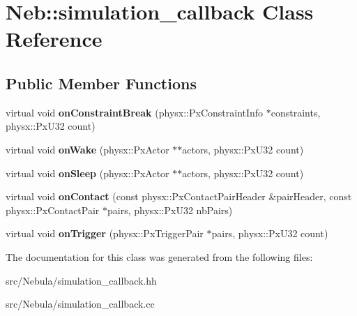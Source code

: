 \hypertarget{classNeb_1_1simulation__callback}{\section{\-Neb\-:\-:simulation\-\_\-callback \-Class \-Reference}
\label{classNeb_1_1simulation__callback}
}
\subsection*{\-Public \-Member \-Functions}
\begin{DoxyCompactItemize}
\item 
\hypertarget{classNeb_1_1simulation__callback_ac4620ed6b4fd70dd432be23811464f05}{virtual void {\bfseries on\-Constraint\-Break} (physx\-::\-Px\-Constraint\-Info $\ast$constraints, physx\-::\-Px\-U32 count)}\label{classNeb_1_1simulation__callback_ac4620ed6b4fd70dd432be23811464f05}

\item 
\hypertarget{classNeb_1_1simulation__callback_a0dcb1c9b1501e762bb31e0f86b269955}{virtual void {\bfseries on\-Wake} (physx\-::\-Px\-Actor $\ast$$\ast$actors, physx\-::\-Px\-U32 count)}\label{classNeb_1_1simulation__callback_a0dcb1c9b1501e762bb31e0f86b269955}

\item 
\hypertarget{classNeb_1_1simulation__callback_a8bedf1e4bac3c5ccaa62ba0563e2f5ee}{virtual void {\bfseries on\-Sleep} (physx\-::\-Px\-Actor $\ast$$\ast$actors, physx\-::\-Px\-U32 count)}\label{classNeb_1_1simulation__callback_a8bedf1e4bac3c5ccaa62ba0563e2f5ee}

\item 
\hypertarget{classNeb_1_1simulation__callback_abeeb54fbe8acef8d489cf7d1d36b2f8e}{virtual void {\bfseries on\-Contact} (const physx\-::\-Px\-Contact\-Pair\-Header \&pair\-Header, const physx\-::\-Px\-Contact\-Pair $\ast$pairs, physx\-::\-Px\-U32 nb\-Pairs)}\label{classNeb_1_1simulation__callback_abeeb54fbe8acef8d489cf7d1d36b2f8e}

\item 
\hypertarget{classNeb_1_1simulation__callback_a206c42eb19564a590be1e17aaca2fe7a}{virtual void {\bfseries on\-Trigger} (physx\-::\-Px\-Trigger\-Pair $\ast$pairs, physx\-::\-Px\-U32 count)}\label{classNeb_1_1simulation__callback_a206c42eb19564a590be1e17aaca2fe7a}

\end{DoxyCompactItemize}


\-The documentation for this class was generated from the following files\-:\begin{DoxyCompactItemize}
\item 
src/\-Nebula/simulation\-\_\-callback.\-hh\item 
src/\-Nebula/simulation\-\_\-callback.\-cc\end{DoxyCompactItemize}
